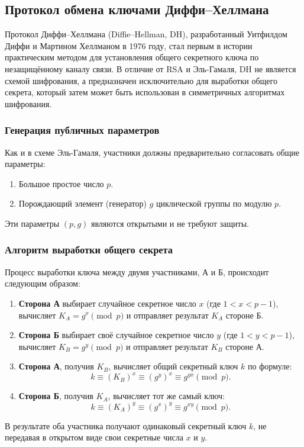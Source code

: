 \subsection{Протокол обмена ключами Диффи–Хеллмана}

Протокол Диффи–Хеллмана (Diffie–Hellman, DH), разработанный Уитфилдом Диффи и Мартином Хеллманом в 1976 году, стал первым в истории практическим методом для установления общего секретного ключа по незащищённому каналу связи. В отличие от RSA и Эль-Гамаля, DH не является схемой шифрования, а предназначен исключительно для выработки общего секрета, который затем может быть использован в симметричных алгоритмах шифрования.

\subsubsection{Генерация публичных параметров}
Как и в схеме Эль-Гамаля, участники должны предварительно согласовать общие параметры:
\begin{enumerate}
    \item Большое простое число $p$.
    \item Порождающий элемент (генератор) $g$ циклической группы по модулю $p$.
\end{enumerate}
Эти параметры $(p, g)$ являются открытыми и не требуют защиты.

\subsubsection{Алгоритм выработки общего секрета}
Процесс выработки ключа между двумя участниками, А и Б, происходит следующим образом:
\begin{enumerate}
    \item \textbf{Сторона А} выбирает случайное секретное число $x$ (где $1 < x < p-1$), вычисляет $K_A = g^x \pmod p$ и отправляет результат $K_A$ стороне Б.
    
    \item \textbf{Сторона Б} выбирает своё случайное секретное число $y$ (где $1 < y < p-1$), вычисляет $K_B = g^y \pmod p$ и отправляет результат $K_B$ стороне А.
    
    \item \textbf{Сторона А}, получив $K_B$, вычисляет общий секретный ключ $k$ по формуле:
    \[ k \equiv (K_B)^x \equiv (g^y)^x \equiv g^{yx} \pmod p. \]
    
    \item \textbf{Сторона Б}, получив $K_A$, вычисляет тот же самый ключ:
    \[ k \equiv (K_A)^y \equiv (g^x)^y \equiv g^{xy} \pmod p. \]
\end{enumerate}
В результате оба участника получают одинаковый секретный ключ $k$, не передавая в открытом виде свои секретные числа $x$ и $y$.

